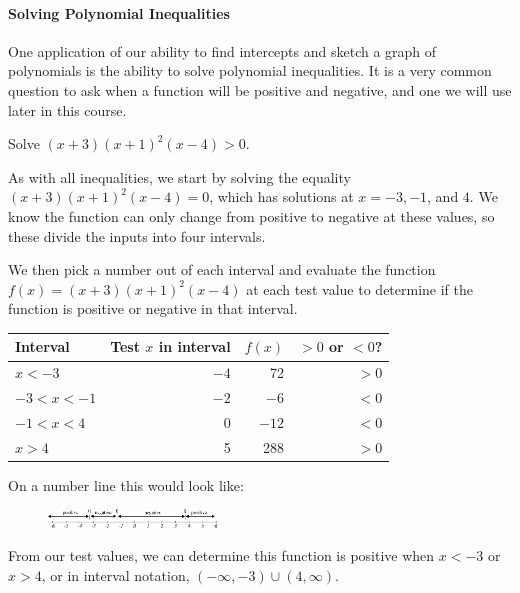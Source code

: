 \paragraph*{Solving Polynomial Inequalities}
One application of our ability to find intercepts and sketch a graph of polynomials is the ability to solve polynomial inequalities. It is a very common question to ask when a function will be positive and negative, and one we will use later in this course.

\begin{example}
Solve $(x+3)(x+1)^2(x-4)>0$.

\begin{solution} As with all inequalities, we start by solving the equality $(x+3)(x+1)^2(x-4)=0$, which has solutions at $x= -3, -1$, and $4$. We know the function can only change from positive to negative at these values, so these divide the inputs into four intervals.

We then pick a number out of each interval and evaluate the function $f(x)=(x+3)(x+1)^2(x-4)$ at each test value to determine if the function is positive or negative in that interval.

\begin{table}[!ht]
	\centering
  \begin{tabular}{lrrr}
    \toprule
    Interval     & Test $x$ in interval & $f(x)$ & $ > 0$ or $< 0$?\\
    \midrule
    $x < -3$     & $-4$                 & 72     & $ > 0 $\\
    $-3< x< -1$  & $-2$                 & $-6$   & $ < 0$\\
    $-1 < x < 4$ &   0                  & $-12$  & $ < 0$\\
    $x > 4 $     &   5                  & 288    & $ > 0 $\\
    \bottomrule
\end{tabular}
\end{table}
On a number line this would look like:

\begin{figure}[!ht]
\centering
\includegraphics[width=0.4\textwidth]{img/chap1/sec1-5/image068.png}
\caption{}
\end{figure}
From our test values, we can determine this function is positive when $x<-3$ or $x>4$, or in interval notation, $(-\infty,-3)\cup (4,\infty)$.
\end{solution}\end{example}

